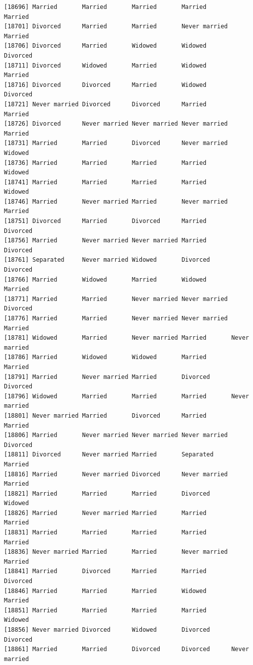 \documentclass[
  letterpaper,
  DIV=11,
  numbers=noendperiod,
  oneside]{scrartcl}
\begin{document}
\begin{verbatim}
[18696] Married       Married       Married       Married       Married      
[18701] Divorced      Married       Married       Never married Married      
[18706] Divorced      Married       Widowed       Widowed       Divorced     
[18711] Divorced      Widowed       Married       Widowed       Married      
[18716] Divorced      Divorced      Married       Widowed       Divorced     
[18721] Never married Divorced      Divorced      Married       Married      
[18726] Divorced      Never married Never married Never married Married      
[18731] Married       Married       Divorced      Never married Widowed      
[18736] Married       Married       Married       Married       Widowed      
[18741] Married       Married       Married       Married       Widowed      
[18746] Married       Never married Married       Never married Married      
[18751] Divorced      Married       Divorced      Married       Divorced     
[18756] Married       Never married Never married Married       Divorced     
[18761] Separated     Never married Widowed       Divorced      Divorced     
[18766] Married       Widowed       Married       Widowed       Married      
[18771] Married       Married       Never married Never married Divorced     
[18776] Married       Married       Never married Never married Married      
[18781] Widowed       Married       Never married Married       Never married
[18786] Married       Widowed       Widowed       Married       Married      
[18791] Married       Never married Married       Divorced      Divorced     
[18796] Widowed       Married       Married       Married       Never married
[18801] Never married Married       Divorced      Married       Married      
[18806] Married       Never married Never married Never married Divorced     
[18811] Divorced      Never married Married       Separated     Married      
[18816] Married       Never married Divorced      Never married Married      
[18821] Married       Married       Married       Divorced      Widowed      
[18826] Married       Never married Married       Married       Married      
[18831] Married       Married       Married       Married       Married      
[18836] Never married Married       Married       Never married Married      
[18841] Married       Divorced      Married       Married       Divorced     
[18846] Married       Married       Married       Widowed       Married      
[18851] Married       Married       Married       Married       Widowed      
[18856] Never married Divorced      Widowed       Divorced      Divorced     
[18861] Married       Married       Divorced      Divorced      Never married

\end{verbatim}
\end{document}
